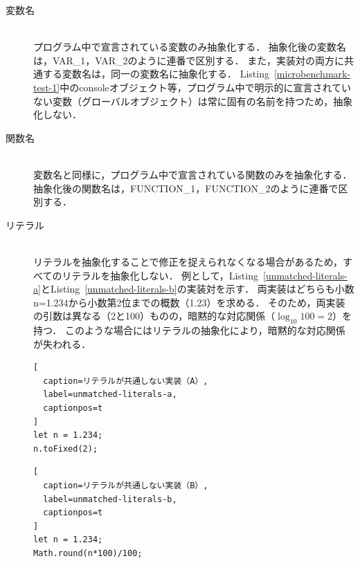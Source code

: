 \documentclass[11pt]{jreport}
\begin{document}
\begin{description}

\item[変数名]\mbox{}\\
プログラム中で宣言されている変数のみ抽象化する．
抽象化後の変数名は，VAR\_1，VAR\_2のように連番で区別する．
また，実装対の両方に共通する変数名は，同一の変数名に抽象化する．
Listing~\ref{microbenchmark-test-1}中のconsoleオブジェクト等，プログラム中で明示的に宣言されていない変数（グローバルオブジェクト）は常に固有の名前を持つため，抽象化しない．

\item[関数名]\mbox{}\\
変数名と同様に，プログラム中で宣言されている関数のみを抽象化する．
抽象化後の関数名は，FUNCTION\_1，FUNCTION\_2のように連番で区別する．

\item[リテラル]\mbox{}\\
リテラルを抽象化することで修正を捉えられなくなる場合があるため，すべてのリテラルを抽象化しない．
例として，Listing~\ref{unmatched-literals-a}とListing~\ref{unmatched-literals-b}の実装対を示す．
両実装はどちらも小数n=1.234から小数第2位までの概数（1.23）を求める．
そのため，両実装の引数は異なる（2と100）ものの，暗黙的な対応関係（\begin{math}\log_{10} 100=2\end{math}）を持つ．
このような場合にはリテラルの抽象化により，暗黙的な対応関係が失われる．

\end{description}


\begin{figure}[t]
\captionsetup{name=Listing}
\hspace{0.04\columnwidth}
\begin{minipage}[b]{0.445\linewidth}
\begin{lstlisting}[
  caption=リテラルが共通しない実装（A）,
  label=unmatched-literals-a,
  captionpos=t
]
let n = 1.234;
n.toFixed(2);
\end{lstlisting}
\end{minipage}
\hspace{0.059\columnwidth}
\begin{minipage}[b]{0.445\linewidth}
\begin{lstlisting}[
  caption=リテラルが共通しない実装（B）,
  label=unmatched-literals-b,
  captionpos=t
]
let n = 1.234;
Math.round(n*100)/100;
\end{lstlisting}
\end{minipage}
\end{figure}
\end{document}
